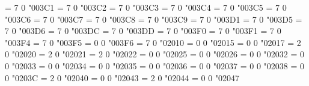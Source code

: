 \Umathchardef\muprho = 7 0 "003C1 %
\Umathchardef\mupvarsigma = 7 0 "003C2 %
\Umathchardef\mupsigma = 7 0 "003C3 %
\Umathchardef\muptau = 7 0 "003C4 %
\Umathchardef\mupupsilon = 7 0 "003C5 %
\Umathchardef\mupvarphi = 7 0 "003C6 %
\Umathchardef\mupchi = 7 0 "003C7 %
\Umathchardef\muppsi = 7 0 "003C8 %
\Umathchardef\mupomega = 7 0 "003C9 %
\Umathchardef\mupvartheta = 7 0 "003D1 %
\Umathchardef\mupphi = 7 0 "003D5 %
\Umathchardef\mupvarpi = 7 0 "003D6 %
\Umathchardef\upDigamma = 7 0 "003DC %
\Umathchardef\updigamma = 7 0 "003DD %
\Umathchardef\mupvarkappa = 7 0 "003F0 %
\Umathchardef\mupvarrho = 7 0 "003F1 %
\Umathchardef\mupvarTheta = 7 0 "003F4 %
\Umathchardef\mupepsilon = 7 0 "003F5 %
\Umathchardef\upbackepsilon = 0 0 "003F6 %
\Umathchardef\mathhyphen = 7 0 "02010 %
\Umathchardef\horizbar = 0 0 "02015 %
\def\Vert{\Udelimiter 0 0 "02016 }
\def\|{\Vert}
\Umathchardef\twolowline = 0 0 "02017 %
\Umathchardef\dagger = 2 0 "02020 %
\Umathchardef\ddagger = 2 0 "02021 %
\Umathchardef\smblkcircle = 2 0 "02022 %
\Umathchardef\enleadertwodots = 0 0 "02025 %
\Umathchardef\unicodeellipsis = 0 0 "02026 %
\Umathchardef\prime = 0 0 "02032 %
\Umathchardef\dprime = 0 0 "02033 %
\Umathchardef\trprime = 0 0 "02034 %
\Umathchardef\backprime = 0 0 "02035 %
\Umathchardef\backdprime = 0 0 "02036 %
\Umathchardef\backtrprime = 0 0 "02037 %
\Umathchardef\caretinsert = 0 0 "02038 %
\Umathchardef\Exclam = 0 0 "0203C %
\Umathchardef\tieconcat = 2 0 "02040 %
\Umathchardef\hyphenbullet = 0 0 "02043 %
\Umathchardef\fracslash = 2 0 "02044 %
\Umathchardef\Question = 0 0 "02047 %
